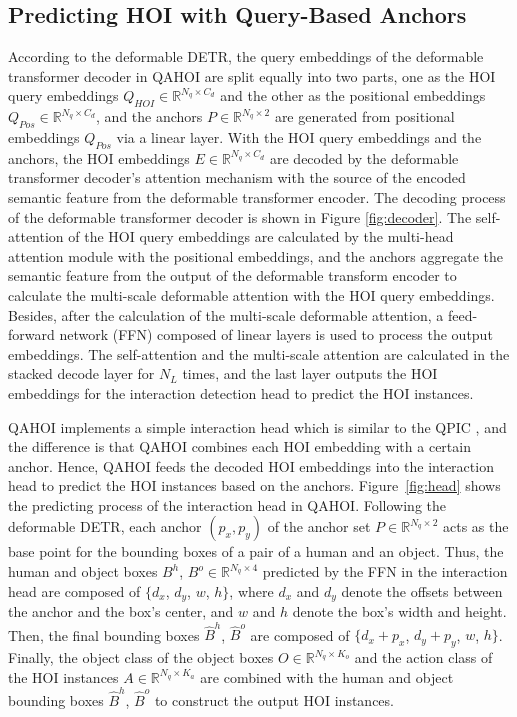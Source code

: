 \documentclass[10pt,twocolumn,letterpaper]{article}
\begin{document}
\subsection{Predicting HOI with Query-Based Anchors}
According to the deformable DETR,
the query embeddings of the deformable transformer decoder in QAHOI are split equally into two parts,
one as the HOI query embeddings $Q_{HOI}\in \mathbb{R}^{N_{q}\times C_{d}}$ and the other as the positional embeddings $Q_{Pos}\in \mathbb{R}^{N_{q}\times C_{d}}$,
and the anchors $P\in\mathbb{R}^{N_{q}\times 2}$ are generated from positional embeddings $Q_{Pos}$ via a linear layer.
With the HOI query embeddings and the anchors, the HOI embeddings $E\in\mathbb{R}^{N_{q}\times C_{d}}$ are decoded by the deformable transformer decoder's attention mechanism with the source of the encoded semantic feature from the deformable transformer encoder. 
The decoding process of the deformable transformer decoder is shown in Figure \ref{fig:decoder}.
The self-attention of the HOI query embeddings are calculated by the multi-head attention module \cite{waswani2017attention} with the positional embeddings,
and the anchors aggregate the semantic feature from the output of the deformable transform encoder
to calculate the multi-scale deformable attention \cite{zhu2020deformable} with the HOI query embeddings.
Besides, after the calculation of the multi-scale deformable attention,
a feed-forward network (FFN) composed of linear layers is used to process the output embeddings.
The self-attention and the multi-scale attention are calculated in the stacked decode layer for $N_{L}$ times,
and the last layer outputs the HOI embeddings for the interaction detection head to predict the HOI instances.

QAHOI implements a simple interaction head which is similar to the QPIC \cite{tamura2021qpic},
and the difference is that QAHOI combines each HOI embedding with a certain anchor.
Hence, QAHOI feeds the decoded HOI embeddings into the interaction head to predict the HOI instances based on the anchors.
Figure~\ref{fig:head} shows the predicting process of the interaction head in QAHOI.
Following the deformable DETR, each anchor $(p_{x}, p_{y})$ of the anchor set $P\in\mathbb{R}^{N_{q}\times 2}$
acts as the base point for the bounding boxes of a pair of a human and an object.
Thus, the human and object boxes $B^{h}$, $B^{o}\in\mathbb{R}^{N_{q}\times 4}$ predicted by the FFN in the interaction head
are composed of $\{d_{x}$, $d_{y}$, $w$, $h\}$,
where $d_{x}$ and $d_{y}$ denote the offsets between the anchor and the box's center, and $w$ and $h$ denote the box's width and height.
Then, the final bounding boxes $\hat{B}^{h}$, $\hat{B}^{o}$ are composed of $\{d_{x}+p_{x}$, $d_{y}+p_{y}$, $w$, $h\}$.
Finally, the object class of the object boxes $O\in\mathbb{R}^{N_{q}\times K_{o}}$
and the action class of the HOI instances $A\in\mathbb{R}^{N_{q}\times K_{a}}$
are combined with the human and object bounding boxes $\hat{B}^{h}$, $\hat{B}^{o}$ to construct the output HOI instances.
\end{document}
